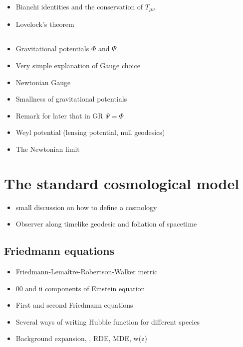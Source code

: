 \begin{itemize}
\item Bianchi identities and the conservation of $T_{\mu \nu}$
\item Lovelock's theorem 
\end{itemize}

\subsection{}

\begin{itemize}
\item Gravitational potentials $\Phi$ and $\Psi$.
\item Very simple explanation of Gauge choice 
\item Newtonian Gauge
\item Smallness of gravitational potentials 
\item Remark for later that in GR $\Psi=\Phi$
\item Weyl potential (lensing potential, null geodesics)
\item{The Newtonian limit} 
\end{itemize}


\section{The standard cosmological model}

\begin{itemize}
\item small discussion on how to define a cosmology
\item Observer along timelike geodesic and foliation of spacetime
\end{itemize}

\subsection{Friedmann equations}
 \begin{itemize}
 \item Friedmann-Lemaître-Robertson-Walker metric
 \item 00 and ii components of Einstein equation
 \item First and second Friedmann equations
 \item Several ways of writing Hubble function for different species
 \item Background expansion, , RDE, MDE, w(z)
 \end{itemize}

